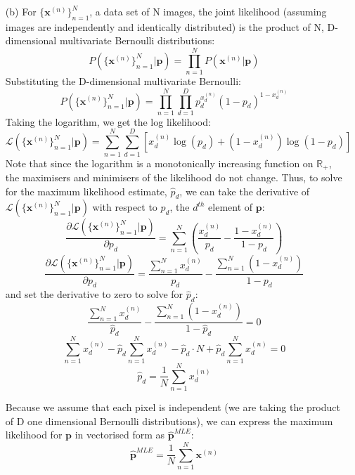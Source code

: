 \documentclass[12pt]{article}
\begin{document}
\begin{enumerate}
\item[(b)] For $\{\textbf{x}^{(n)}\}_{n=1}^N$, a data set of N images, the joint likelihood (assuming images are independently and identically distributed) is the product of N, D-dimensional multivariate Bernoulli distributions:
$$P(\{\textbf{x}^{(n)}\}_{n=1}^N|\textbf{p}) = \prod_{n=1}^N P(\textbf{x}^{(n)} | \textbf{p})$$
Substituting the D-dimensional multivariate Bernoulli:
$$P(\{\textbf{x}^{(n)}\}_{n=1}^N|\textbf{p}) = \prod_{n=1}^{N}\prod_{d=1}^{D} p_d^{x_d^{(n)}} (1-p_d)^{1-x_d^{(n)}}$$
Taking the logarithm, we get the log likelihood:
$$\mathcal{L}(\{\textbf{x}^{(n)}\}_{n=1}^N|\textbf{p}) = \sum_{n=1}^{N}\sum_{d=1}^{D} [x_d^{(n)}\log(p_d) +  (1-x_d^{(n)})\log(1-p_d)]$$
Note that since the logarithm is a monotonically increasing function on $\mathbb{R}_+$, the maximisers and minimisers of the likelihood do not change.
Thus, to solve for the maximum likelihood estimate, $\hat p_d$, we can take the derivative of $\mathcal{L}(\{\textbf{x}^{(n)}\}_{n=1}^N|\textbf{p})$ with respect to $p_d$, the $d^{th}$ element of $\textbf{p}$:
$$\frac{\partial\mathcal{L}(\{\textbf{x}^{(n)}\}_{n=1}^N|\textbf{p})}{\partial p_d} = \sum_{n=1}^{N} (\frac{x_d^{(n)}}{p_d} -  \frac{1-x_d^{(n)}}{1-p_d})$$
$$\frac{\partial\mathcal{L}(\{\textbf{x}^{(n)}\}_{n=1}^N|\textbf{p})}{\partial p_d} = \frac{\sum_{n=1}^{N} x_d^{(n)}}{p_d} -  \frac{\sum_{n=1}^{N} (1-x_d^{(n)})}{1-p_d}$$
and set the derivative to zero to solve for $\hat p_d$:
$$\frac{\sum_{n=1}^{N} x_d^{(n)}}{\hat p_d} -  \frac{\sum_{n=1}^{N} (1-x_d^{(n)})}{1-\hat p_d} = 0$$
$$ \sum_{n=1}^{N} x_d^{(n)} - \hat p_d\sum_{n=1}^{N} x_d^{(n)} - \hat p_d  \cdot N + \hat p_d \sum_{n=1}^{N}x_d^{(n)} = 0$$
$$  \hat p_d = \frac{1}{N}\sum_{n=1}^{N} x_d^{(n)}$$

Because we assume that each pixel is independent (we are taking the product of D one dimensional Bernoulli distributions), we can express the maximum likelihood for $\textbf{p}$ in vectorised form as $\hat{\textbf{p}}^{MLE}$:
$$\hat{\textbf{p}}^{MLE} = \frac{1}{N}\sum_{n=1}^{N} \textbf{x}^{(n)}$$


\end{enumerate}
\end{document}
